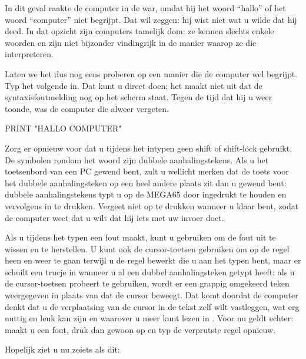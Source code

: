   In dit geval raakte de computer in de war, omdat hij het woord ``hallo'' of het woord ``computer'' niet begrijpt. Dat wil zeggen: hij wist niet wat u wilde dat hij deed. In dat opzicht zijn computers tamelijk dom: ze kennen slechts enkele woorden en zijn niet bijzonder vindingrijk in de manier waarop ze die interpreteren.

\needspace{4cm} %

Laten we het dus nog eens proberen op een manier die de computer wel begrijpt. Typ het volgende in. Dat kunt u direct doen; het maakt niet uit dat de syntaxisfoutmelding nog op het scherm staat. Tegen de tijd dat hij u weer  toonde, was de computer die alweer vergeten.

\begin{screencode}
PRINT "HALLO COMPUTER"
\end{screencode}

Zorg er opnieuw voor dat u tijdens het intypen geen shift of shift-lock gebruikt. De symbolen rondom het woord  zijn dubbele aanhalingstekens. Als u het toetsenbord van een PC gewend bent, zult u wellicht merken dat de toets voor het dubbele aanhalingsteken op een heel andere plaats zit dan u gewend bent: dubbele aanhalingstekens typt u op de MEGA65 door  ingedrukt te houden en vervolgens  in te drukken. Vergeet niet op  te drukken wanneer u klaar bent, zodat de computer weet dat u wilt dat hij iets met uw invoer doet.

Als u tijdens het typen een fout maakt, kunt u  gebruiken om de fout uit te wissen en te herstellen. U kunt ook de cursor-toetsen gebruiken om op de regel heen en weer te gaan terwijl u de regel bewerkt die u aan het typen bent, maar er schuilt een trucje in wanneer u al een dubbel aanhalingsteken getypt heeft: als u de cursor-toetsen probeert te gebruiken, wordt er een grappig omgekeerd teken weergegeven in plaats van dat de cursor beweegt. Dat komt doordat de computer denkt dat u de verplaatsing van de cursor in de tekst zelf wilt vastleggen, wat erg nuttig en leuk kan zijn en waarover u meer kunt lezen in . Voor nu geldt echter: maakt u een fout, druk dan gewoon op  en typ de verprutste regel opnieuw.

\needspace{4cm} %
Hopelijk ziet u nu zoiets als dit:

